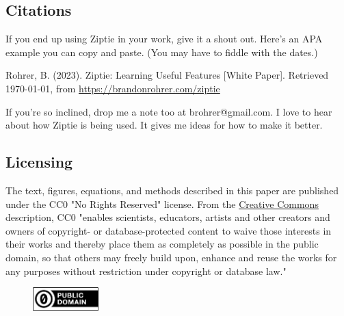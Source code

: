 \subsection{Citations}
\label{subsec:citations}

If you end up using Ziptie in your work, give it a shout out.
Here's an APA example you can copy and paste. (You may have to fiddle with
the dates.)

Rohrer, B. (2023). Ziptie: Learning Useful Features [White Paper].
Retrieved \today, from
\href{https://brandonrohrer.com/ziptie}{https://brandonrohrer.com/ziptie}

If you're so inclined, drop me a note too at brohrer@gmail.com.
I love to hear about how
Ziptie is being used. It gives me ideas for how to make it better.

\subsection{Licensing}
\label{subsec:license}

The text, figures, equations, and methods described in this paper
are published under the CC0 "No Rights Reserved" license.
From the
\href{https://creativecommons.org/public-domain/cc0/}{Creative Commons} description,
CC0 "enables scientists, educators,
artists and other creators and owners of copyright- or database-protected
content to waive those interests in their works and thereby place them as
completely as possible in the public domain, so that others may freely
build upon, enhance and reuse the works for any purposes without restriction
under copyright or database law."

\begin{figure}[ht]
\vskip 0.2in
\begin{center}
\centerline{\includegraphics[width=1.0in]{images/cc-zero.png}}
\label{fig:cc0}
\end{center}
\vskip -0.2in
\end{figure}

